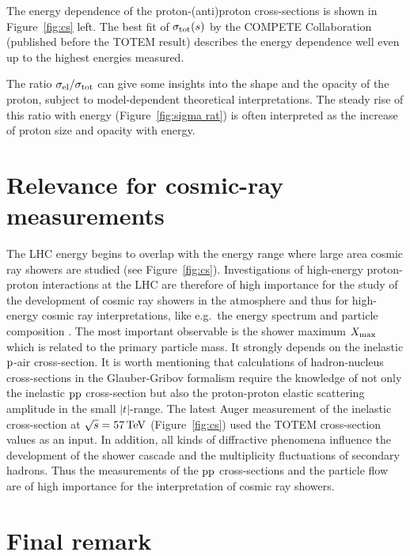 \documentclass[TOTEM]{cern/cernphprep}
\def\un#1{\,{\rm #1}}
\begin{document}
The energy dependence of the proton-(anti)proton cross-sections is shown in Figure~\ref{fig:cs} left. The best fit of $\sigma_{\rm tot}(s)$ by the COMPETE Collaboration \cite{compete} (published before the TOTEM result) describes the energy dependence well even up to the highest energies measured.

The ratio $\sigma_{\rm el}/\sigma_{\rm tot}$ can give some insights into the shape and the opacity of the proton, subject to model-dependent theoretical interpretations. The steady rise of this ratio with energy (Figure~\ref{fig:sigma rat}) is often interpreted as the increase of proton size and opacity with energy. 

\FigRatio

\section{Relevance for cosmic-ray measurements}

The LHC energy begins to overlap with the energy range where large area cosmic ray showers are studied (see Figure~\ref{fig:cs}). Investigations of high-energy proton-proton interactions at the LHC are therefore of high importance for the study of the development of cosmic ray showers in the atmosphere and thus for high-energy cosmic ray interpretations, like e.g.~the energy spectrum and particle composition \cite{enterria}.  The most important observable is the shower maximum $X_{\rm max}$ which is related to the primary particle mass. It strongly depends on the inelastic $\rm p$-air cross-section. It is worth mentioning that calculations of hadron-nucleus cross-sections in the Glauber-Gribov formalism \cite{nagano,glauber} require the knowledge of not only the inelastic $\rm pp$ cross-section but also the proton-proton elastic scattering amplitude in the small $|t|$-range. The latest Auger measurement of the inelastic cross-section at $\sqrt s = 57\un{TeV}$ \cite{auger} (Figure~\ref{fig:cs}) used the TOTEM cross-section values as an input. In addition, all kinds of diffractive phenomena influence the development of the shower cascade and the multiplicity fluctuations of secondary hadrons. Thus the measurements of the $\rm pp$ cross-sections and the particle flow are of high importance for the interpretation of cosmic ray showers.

\section{Final remark}
\end{document}
